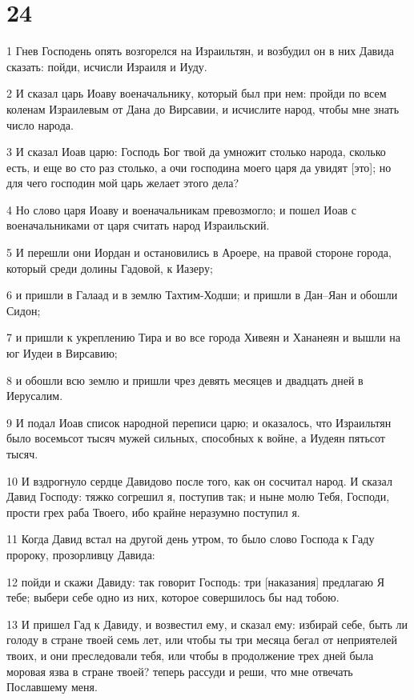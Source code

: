 \chapter{24}

\par 1 Гнев Господень опять возгорелся на Израильтян, и возбудил он в них Давида сказать: пойди, исчисли Израиля и Иуду.
\par 2 И сказал царь Иоаву военачальнику, который был при нем: пройди по всем коленам Израилевым от Дана до Вирсавии, и исчислите народ, чтобы мне знать число народа.
\par 3 И сказал Иоав царю: Господь Бог твой да умножит столько народа, сколько есть, и еще во сто раз столько, а очи господина моего царя да увидят [это]; но для чего господин мой царь желает этого дела?
\par 4 Но слово царя Иоаву и военачальникам превозмогло; и пошел Иоав с военачальниками от царя считать народ Израильский.
\par 5 И перешли они Иордан и остановились в Ароере, на правой стороне города, который среди долины Гадовой, к Иазеру;
\par 6 и пришли в Галаад и в землю Тахтим-Ходши; и пришли в Дан--Яан и обошли Сидон;
\par 7 и пришли к укреплению Тира и во все города Хивеян и Хананеян и вышли на юг Иудеи в Вирсавию;
\par 8 и обошли всю землю и пришли чрез девять месяцев и двадцать дней в Иерусалим.
\par 9 И подал Иоав список народной переписи царю; и оказалось, что Израильтян было восемьсот тысяч мужей сильных, способных к войне, а Иудеян пятьсот тысяч.
\par 10 И вздрогнуло сердце Давидово после того, как он сосчитал народ. И сказал Давид Господу: тяжко согрешил я, поступив так; и ныне молю Тебя, Господи, прости грех раба Твоего, ибо крайне неразумно поступил я.
\par 11 Когда Давид встал на другой день утром, то было слово Господа к Гаду пророку, прозорливцу Давида:
\par 12 пойди и скажи Давиду: так говорит Господь: три [наказания] предлагаю Я тебе; выбери себе одно из них, которое совершилось бы над тобою.
\par 13 И пришел Гад к Давиду, и возвестил ему, и сказал ему: избирай себе, быть ли голоду в стране твоей семь лет, или чтобы ты три месяца бегал от неприятелей твоих, и они преследовали тебя, или чтобы в продолжение трех дней была моровая язва в стране твоей? теперь рассуди и реши, что мне отвечать Пославшему меня.
